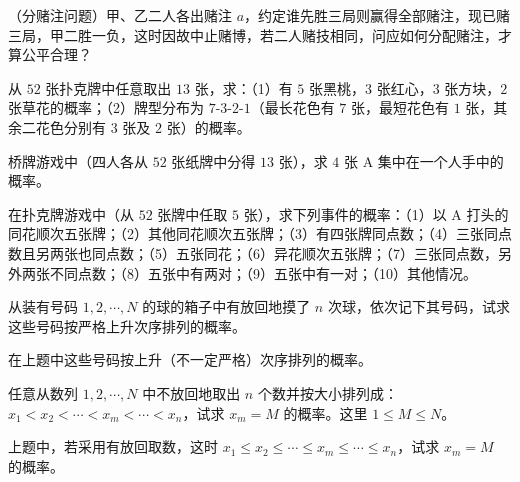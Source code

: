 \documentclass[../../main.tex]{subfiles}
\begin{document}
\begin{exercise}\label{exercise:ch01-16}
（分赌注问题）甲、乙二人各出赌注 $a$，约定谁先胜三局则赢得全部赌注，现已赌三局，甲二胜一负，这时因故中止赌博，若二人赌技相同，问应如何分配赌注，才算公平合理？
\end{exercise}

\begin{exercise}\label{exercise:ch01-17}
从 $52$ 张扑克牌中任意取出 $13$ 张，求：（1）有 $5$ 张黑桃，$3$ 张红心，$3$ 张方块，$2$ 张草花的概率；（2）牌型分布为 $7$-$3$-$2$-$1$（最长花色有 $7$ 张，最短花色有 $1$ 张，其余二花色分别有 $3$ 张及 $2$ 张）的概率。
\end{exercise}

\begin{exercise}\label{exercise:ch01-18}
桥牌游戏中（四人各从 $52$ 张纸牌中分得 $13$ 张），求 $4$ 张 A 集中在一个人手中的概率。
\end{exercise}

\begin{exercise}\label{exercise:ch01-19}
在扑克牌游戏中（从 $52$ 张牌中任取 $5$ 张），求下列事件的概率：（1）以 A 打头的同花顺次五张牌；（2）其他同花顺次五张牌；（3）有四张牌同点数；（4）三张同点数且另两张也同点数；（5）五张同花；（6）异花顺次五张牌；（7）三张同点数，另外两张不同点数；（8）五张中有两对；（9）五张中有一对；（10）其他情况。
\end{exercise}

\begin{exercise}\label{exercise:ch01-20}
从装有号码 $1,2,\cdots,N$ 的球的箱子中有放回地摸了 $n$ 次球，依次记下其号码，试求这些号码按严格上升次序排列的概率。
\end{exercise}

\begin{exercise}\label{exercise:ch01-21}
在上题中这些号码按上升（不一定严格）次序排列的概率。
\end{exercise}

\begin{exercise}\label{exercise:ch01-22}
任意从数列 $1,2,\cdots,N$ 中不放回地取出 $n$ 个数并按大小排列成：$x_1<x_2<\cdots<x_m<\cdots<x_n$，试求 $x_m=M$ 的概率。这里 $1\leqslant M\leqslant N$。
\end{exercise}

\begin{exercise}\label{exercise:ch01-23}
上题中，若采用有放回取数，这时 $x_1\leqslant x_2\leqslant\cdots\leqslant x_m\leqslant\cdots\leqslant x_n$，试求 $x_m=M$ 的概率。
\end{exercise}
\end{document}
